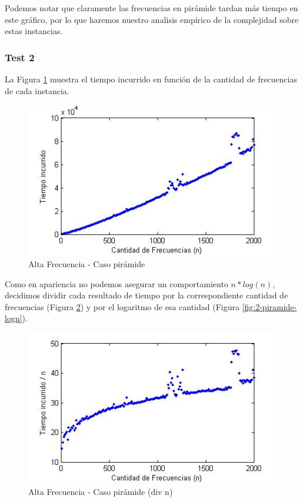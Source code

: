Podemos notar que claramente las frecuencias en pirámide tardan más tiempo en este gráfico, por lo que haremos nuestro analisis empírico de la complejidad sobre estas instancias.

\vspace*{0.6cm}

\subsubsection{Test 2}

La Figura \ref{fig:2-piramide} muestra el tiempo incurrido en función de la cantidad de frecuencias de cada instancia.

\begin{figure}[htb]
	\begin{center}
    		\includegraphics[scale=0.5]{imagenes/2-tren.jpg}
	\end{center}
	\caption{Alta Frecuencia - Caso pirámide}\label{fig:2-piramide}
\end{figure}

Como en apariencia no podemos asegurar un comportamiento $n*log(n)$, decidimos dividir cada resultado de tiempo por la correspondiente cantidad de frecuencias (Figura \ref{fig:2-piramide-n}) y por el logaritmo de esa cantidad (Figura \ref{fig:2-piramide-logn}).

\begin{figure}[htb]
	\begin{center}
    		\includegraphics[scale=0.5]{imagenes/2-tren-div-n.jpg}
	\end{center}
	\caption{Alta Frecuencia - Caso pirámide (div n)}\label{fig:2-piramide-n}
\end{figure}
\FloatBarrier

